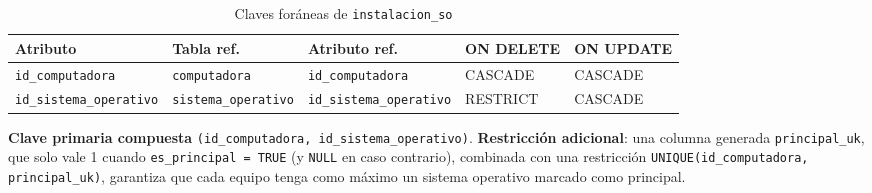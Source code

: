\documentclass[10pt,a4paper]{article}
\begin{document}
\begin{table}[H]
	\centering
	\footnotesize
	\begin{tabular}{p{3.6cm} | p{3.4cm} | p{3.4cm} | p{1.5cm} | p{1.5cm}}\hline \hline
		\textbf{Atributo} & \textbf{Tabla ref.} & \textbf{Atributo ref.} & \textbf{ON DELETE} & \textbf{ON UPDATE} \\ \hline \hline
		\texttt{id\_computadora} & \texttt{computadora} & \texttt{id\_computadora} & CASCADE & CASCADE \\ \hline
		\texttt{id\_sistema\_operativo} & \texttt{sistema\_operativo} & \texttt{id\_sistema\_operativo} & RESTRICT & CASCADE \\ \hline \hline
	\end{tabular}
	\caption{Claves foráneas de \texttt{instalacion\_so}}
	\label{tabla:fk-instso}
\end{table}

\textbf{Clave primaria compuesta} \texttt{(id\_computadora, id\_sistema\_operativo)}. \textbf{Restricción adicional}: una columna generada \texttt{principal\_uk}, que solo vale 1 cuando \texttt{es\_principal = TRUE} (y \texttt{NULL} en caso contrario), combinada con una restricción \texttt{UNIQUE(id\_computadora, principal\_uk)}, garantiza que cada equipo tenga como máximo un sistema operativo marcado como principal.

\subsection{ \color{colorESCOM}{Relaciones y cardinalidades}}
\end{document}
